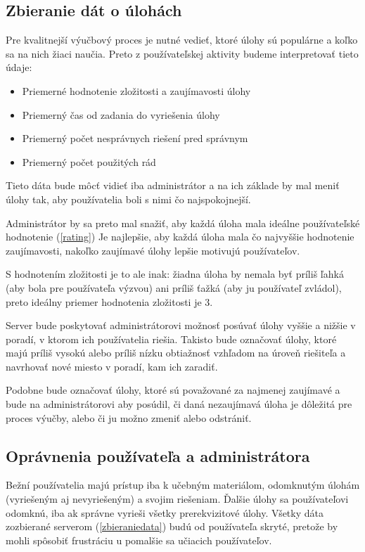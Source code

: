 \subsection{Zbieranie dát o úlohách}
Pre kvalitnejší výučbový proces je nutné vedieť, ktoré úlohy sú populárne a koľko
sa na nich žiaci naučia. Preto z používateľskej aktivity budeme interpretovať tieto údaje:
\begin{itemize}
\item Priemerné hodnotenie zložitosti a zaujímavosti úlohy
\item Priemerný čas od zadania do vyriešenia úlohy
\item Priemerný počet nesprávnych riešení pred správnym
\item Priemerný počet použitých rád
\end{itemize}

Tieto dáta bude môcť vidieť iba administrátor a na ich základe by mal meniť úlohy
tak, aby používatelia boli s nimi čo najspokojnejší.

Administrátor by sa preto mal snažiť, aby každá úloha mala ideálne používateľské hodnotenie (\ref{rating})
Je najlepšie, aby každá úloha mala čo najvyššie hodnotenie zaujímavosti,
nakoľko zaujímavé úlohy lepšie motivujú používateľov.

S hodnotením zložitosti je to ale inak: žiadna úloha by nemala byť príliš ľahká (aby bola pre používateľa výzvou) ani
príliš ťažká (aby ju používateľ zvládol), preto ideálny priemer hodnotenia zložitosti je 3.

Server bude poskytovať administrátorovi možnosť posúvať úlohy vyššie a nižšie v poradí,
v ktorom ich používatelia riešia. Takisto bude označovať úlohy, ktoré majú príliš vysokú alebo
príliš nízku obtiažnosť vzhľadom na úroveň riešiteľa a navrhovať nové miesto v poradí, kam ich zaradiť.

Podobne bude označovať úlohy, ktoré sú považované za najmenej zaujímavé a bude na administrátorovi
aby posúdil, či daná nezaujímavá úloha je dôležitá pre proces výučby, alebo či ju možno zmeniť alebo odstrániť.

\subsection{Oprávnenia používateľa a administrátora}
Bežní používatelia majú prístup iba k učebným materiálom, odomknutým úlohám
(vyriešeným aj nevyriešeným)
 a svojim riešeniam. Ďalšie úlohy sa používateľovi odomknú,
iba ak správne vyrieši všetky prerekvizitové úlohy. Všetky dáta zozbierané serverom (\ref{zbieraniedata})
budú od používateľa skryté, pretože by mohli spôsobiť frustráciu u pomalšie sa učiacich používateľov.

